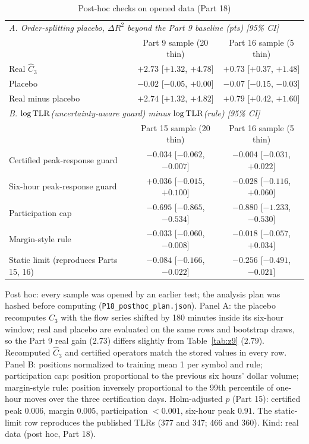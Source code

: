 \documentclass[12pt]{article}
\theoremstyle{definition}
\theoremstyle{remark}
\begin{document}
\begin{table}[!tbp]\centering\small
\begin{threeparttable}
\caption{Post-hoc checks on opened data (Part 18)}\label{tab:p18}
\footnotesize\setlength{\tabcolsep}{3pt}
\begin{tabular}{lcc}
\toprule
\multicolumn{3}{l}{\emph{A. Order-splitting placebo, $\Delta R^2$ beyond the Part 9 baseline (pts) [95\% CI]}}\\
 & Part 9 sample (20 thin) & Part 16 sample (5 thin)\\
\midrule
Real $\hat C_3$ & $+2.73$ [$+1.32$, $+4.78$] & $+0.73$ [$+0.37$, $+1.48$]\\
Placebo & $-0.02$ [$-0.05$, $+0.00$] & $-0.07$ [$-0.15$, $-0.03$]\\
Real minus placebo & $+2.74$ [$+1.32$, $+4.82$] & $+0.79$ [$+0.42$, $+1.60$]\\
\midrule
\multicolumn{3}{l}{\emph{B. $\log{\rm TLR}$(uncertainty-aware guard) minus $\log{\rm TLR}$(rule) [95\% CI]}}\\
 & Part 15 sample (20 thin) & Part 16 sample (5 thin)\\
\midrule
Certified peak-response guard & $-0.034$ [$-0.062$, $-0.007$] & $-0.004$ [$-0.031$, $+0.022$]\\
Six-hour peak-response guard & $+0.036$ [$-0.015$, $+0.100$] & $-0.028$ [$-0.116$, $+0.060$]\\
Participation cap & $-0.695$ [$-0.865$, $-0.534$] & $-0.880$ [$-1.233$, $-0.530$]\\
Margin-style rule & $-0.033$ [$-0.060$, $-0.008$] & $-0.018$ [$-0.057$, $+0.034$]\\
Static limit (reproduces Parts 15, 16) & $-0.084$ [$-0.166$, $-0.022$] & $-0.256$ [$-0.491$, $-0.021$]\\
\bottomrule
\end{tabular}
\begin{tablenotes}\footnotesize\item Post hoc: every sample was opened by an earlier test; the analysis plan was hashed before computing (\texttt{P18\_posthoc\_plan.json}). Panel A: the placebo recomputes $\hat C_3$ with the flow series shifted by 180 minutes inside its six-hour window; real and placebo are evaluated on the same rows and bootstrap draws, so the Part 9 real gain ($2.73$) differs slightly from Table~\ref{tab:z9} ($2.79$). Recomputed $\hat C_3$ and certified operators match the stored values in every row. Panel B: positions normalized to training mean 1 per symbol and rule; participation cap: position proportional to the previous six hours' dollar volume; margin-style rule: position inversely proportional to the 99th percentile of one-hour moves over the three certification days. Holm-adjusted $p$ (Part 15): certified peak $0.006$, margin $0.005$, participation $<0.001$, six-hour peak $0.91$. The static-limit row reproduces the published TLRs (377 and 347; 466 and 360). Kind: real data (post hoc, Part 18).\end{tablenotes}
\end{threeparttable}
\end{table}
\end{document}
